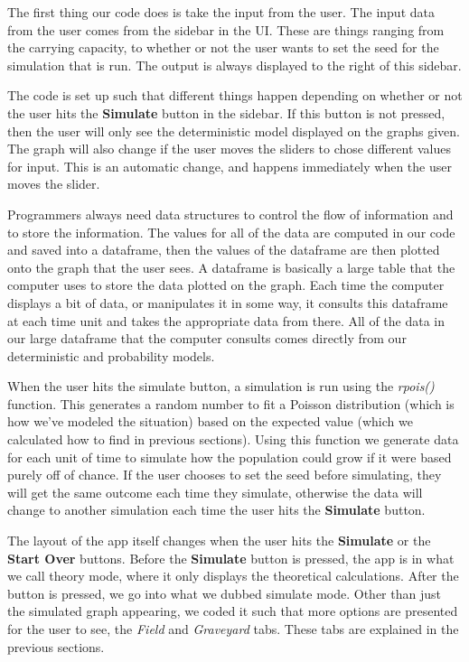 \documentclass{article}\usepackage[]{graphicx}\usepackage[]{color}
\begin{document}
The first thing our code does is take the input from the user. The input data from the user comes from the sidebar in the UI. These are things ranging from the carrying capacity, to whether or not the user wants to set the seed for the simulation that is run. The output is always displayed to the right of this sidebar. 

The code is set up such that different things happen depending on whether or not the user hits the \textbf{Simulate} button in the sidebar. If this button is not pressed, then the user will only see the deterministic model displayed on the graphs given. The graph will also change if the user moves the sliders to chose different values for input. This is an automatic change, and happens immediately when the user moves the slider. 

Programmers always need data structures to control the flow of information and to store the information. The values for all of the data are computed in our code and saved into a dataframe, then the values of the dataframe are then plotted onto the graph that the user sees. A dataframe is basically a large table that the computer uses to store the data plotted on the graph. Each time the computer displays a bit of data, or manipulates it in some way, it consults this dataframe at each time unit and takes the appropriate data from there. All of the data in our large dataframe that the computer consults comes directly from our deterministic and probability models.

When the user hits the simulate button, a simulation is run using the \textit{rpois()} function. This generates a random number to fit a Poisson distribution (which is how we've modeled the situation) based on the expected value (which we calculated how to find in previous sections). Using this function we generate data for each unit of time to simulate how the population could grow if it were based purely off of chance. If the user chooses to set the seed before simulating, they will get the same outcome each time they simulate, otherwise the data will change to another simulation each time the user hits the \textbf{Simulate} button. 

The layout of the app itself changes when the user hits the \textbf{Simulate} or the \textbf{Start Over} buttons. Before the \textbf{Simulate} button is pressed, the app is in what we call theory mode, where it only displays the theoretical calculations. After the button is pressed, we go into what we dubbed simulate mode. Other than just the simulated graph appearing, we coded it such that more options are presented for the user to see, the \textit{Field} and \textit{Graveyard} tabs. These tabs are explained in the previous sections. 
\end{document}
